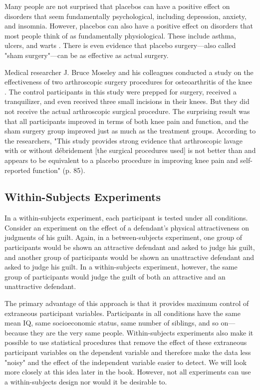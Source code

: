 \color{fgcolor}\begin{kframe}

Many people are not surprised that placebos can have a positive effect on disorders that seem fundamentally psychological, including depression, anxiety, and insomnia. However, placebos can also have a positive effect on disorders that most people think of as fundamentally physiological. These include asthma, ulcers, and warts \citep{shapiro_powerful_2000}. There is even evidence that placebo surgery---also called "sham surgery"---can be as effective as actual surgery.

Medical researcher J. Bruce Moseley and his colleagues conducted a study on the effectiveness of two arthroscopic surgery procedures for osteoarthritis of the knee \citep{moseley_controlled_2002}. The control participants in this study were prepped for surgery, received a tranquilizer, and even received three small incisions in their knees. But they did not receive the actual arthroscopic surgical procedure. The surprising result was that all participants improved in terms of both knee pain and function, and the sham surgery group improved just as much as the treatment groups. According to the researchers, "This study provides strong evidence that arthroscopic lavage with or without d\'ebridement [the surgical procedures used] is not better than and appears to be equivalent to a placebo procedure in improving knee pain and self-reported function" (p. 85).
\end{kframe}

\subsection{Within-Subjects Experiments}

In a within-subjects experiment, each participant is tested under all conditions. Consider an experiment on the effect of a defendant's physical attractiveness on judgments of his guilt. Again, in a between-subjects experiment, one group of participants would be shown an attractive defendant and asked to judge his guilt, and another group of participants would be shown an unattractive defendant and asked to judge his guilt. In a within-subjects experiment, however, the same group of participants would judge the guilt of both an attractive and an unattractive defendant.

The primary advantage of this approach is that it provides maximum control of extraneous participant variables. Participants in all conditions have the same mean IQ, same socioeconomic status, same number of siblings, and so on---because they are the very same people. Within-subjects experiments also make it possible to use statistical procedures that remove the effect of these extraneous participant variables on the dependent variable and therefore make the data less "noisy" and the effect of the independent variable easier to detect. We will look more closely at this idea later in the book. However, not all experiments can use a within-subjects design nor would it be desirable to.

